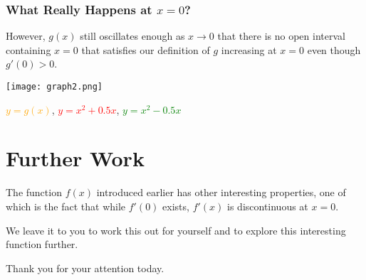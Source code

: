 \documentclass{beamer}
\theoremstyle{definition} %
\begin{document}
\begin{frame}
    \frametitle{What Really Happens at $x=0$?}
    However, $g(x)$ still oscillates enough as $x\to 0$ that there is no open interval containing $x=0$ that satisfies our definition of $g$ increasing at $x=0$ even though $g'(0)>0$.\pause

    \begin{center}
    \texttt{[image: graph2.png]}

    \textcolor{orange}{$y=g(x)$}, \textcolor{red}{$y=x^2+0.5x$}, \textcolor{green}{$y=x^2-0.5x$}
    \end{center}

\end{frame}

\section{Further Work}

\begin{frame}
    The function $f(x)$ introduced earlier has other interesting properties, one of which is the fact that while $f'(0)$ exists, $f'(x)$ is discontinuous at $x=0$.\vspace{.5cm}

    We leave it to you to work this out for yourself and to explore this interesting function further.\vspace{.5cm}

    Thank you for your attention today.
\end{frame}
\end{document}
